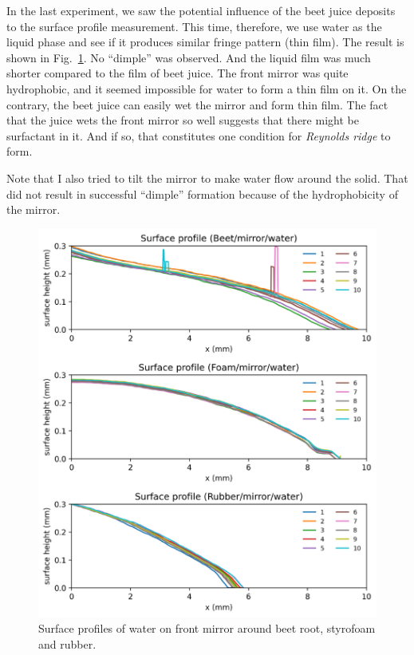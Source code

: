 \documentclass[12pt]{article}
\begin{document}
In the last experiment, we saw the potential influence of the beet juice deposits to the surface profile measurement. This time, therefore, we use water as the liquid phase and see if it produces similar fringe pattern (thin film). The result is shown in Fig.~\ref{fig:surface_profile_water_test_04102024}. No ``dimple'' was observed. And the liquid film was much shorter compared to the film of beet juice. The front mirror was quite hydrophobic, and it seemed impossible for water to form a thin film on it. On the contrary, the beet juice can easily wet the mirror and form thin film. The fact that the juice wets the front mirror so well suggests that there might be surfactant in it. And if so, that constitutes one condition for \emph{Reynolds ridge} to form. 

Note that I also tried to tilt the mirror to make water flow around the solid. That did not result in successful ``dimple'' formation because of the hydrophobicity of the mirror.
\begin{figure}
    \centering
    \includegraphics[width=\textwidth]{Figures/surface_profile_water_test_04102024.pdf}
    \caption{Surface profiles of water on front mirror around beet root, styrofoam and rubber.}
    \label{fig:surface_profile_water_test_04102024}
\end{figure}
\end{document}
